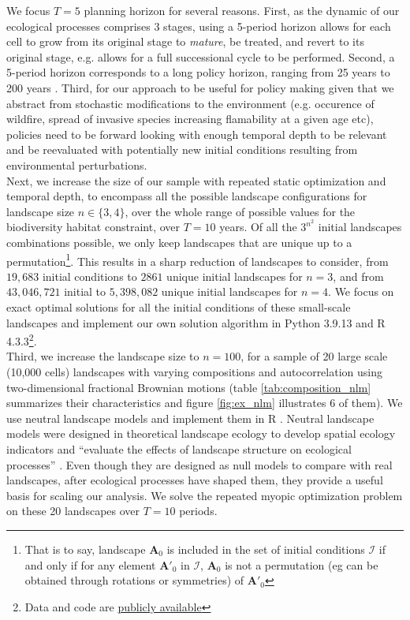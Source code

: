  We focus $T=5$ planning horizon for several reasons. First, as the dynamic of our ecological processes comprises 3 stages, using a 5-period horizon allows for each cell to grow from its original stage to \textit{mature}, be treated, and revert to its original stage, e.g. allows for a full successional cycle to be performed. Second, a 5-period horizon corresponds to a long policy horizon, ranging from 25 years to 200 years \citep{mccoll_gausden_pathways_2019, thomas_wildlife_1979}.
Third, for our approach to be useful for policy making given that we abstract from stochastic modifications to the environment (e.g. occurence of wildfire, spread of invasive species increasing flamability at a given age etc), policies need to be forward looking with enough temporal depth to be relevant and be reevaluated with potentially new initial conditions resulting from environmental perturbations.\\
Next, we increase the size of our sample with repeated static optimization and temporal depth, to encompass all the possible landscape configurations for landscape size $n \in \{3, 4\}$, over the whole range of possible values for the biodiversity habitat constraint, over $T=10$ years. 
Of all the $3^{n^2}$ initial landscapes combinations possible, we only keep landscapes that are unique up to a permutation\footnote{That is to say, landscape $\mathbf{A}_0$ is included in the set of initial conditions $\mathcal{I}$ if and only if for any element $\mathbf{A'}_0$ in $\mathcal{I}$, $\mathbf{A}_0$ is not a permutation (eg can be obtained through rotations or symmetries) of $\mathbf{A'}_0$}. This results in a sharp reduction of landscapes to consider, from $19,683$ initial conditions to $2861$ unique initial landscapes for $n=3$, and from $43,046,721$ initial to $5,398,082$ unique initial landscapes for $n=4$. We focus on exact optimal solutions for all the initial conditions of these small-scale landscapes and implement our own solution algorithm in Python 3.9.13 and R 4.3.3\footnote{Data and code are \href{https://github.com/sim-jean/Landscape_connectivity_dilemma}{publicly available}}.
\\
Third, we increase the landscape size to $n=100$, for a sample of 20 large scale (10,000 cells) landscapes with varying compositions and autocorrelation using two-dimensional fractional Brownian motions  (table \ref{tab:composition_nlm} summarizes their characteristics and figure \ref{fig:ex_nlm} illustrates 6 of them). We use neutral landscape models \citep{caswell_community_1976, gardner_neutral_2007} and implement them in \textsf{R} \citep{sciaini_nlmr_2018}. Neutral landscape models were designed in theoretical landscape ecology to develop spatial ecology indicators and ``evaluate the effects of landscape structure on ecological processes'' \citep{with_neutral_1997}. Even though they are designed as null models to compare with real landscapes, after ecological processes have shaped them, they provide a useful basis for scaling our analysis. We solve the repeated myopic optimization problem on these 20 landscapes over $T=10$ periods.\\
